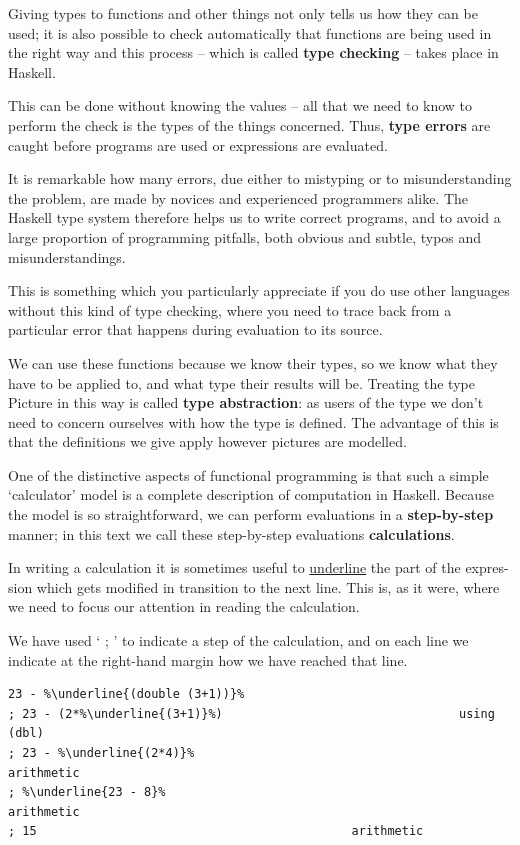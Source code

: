 \documentclass[tikz,border=10pt]{project_plan}
\begin{document}
Giving types to functions and other things not only tells us how they can be used;
it is also possible to check automatically that functions are being used in the right
way and this process – which is called \textbf{type checking} – takes place in Haskell.

This can be done without
knowing the values – all that we need to know to perform the
check is the types of the things concerned. Thus, \textbf{type errors} are caught
before programs are used or expressions are evaluated.

It is remarkable how many errors, due either to mistyping or to misunderstanding
the problem, are made by novices and experienced programmers alike. The
Haskell type system therefore helps us to write correct programs, and to avoid a large
proportion of programming pitfalls, both obvious and subtle, typos and misunderstandings.

This is something which you particularly appreciate if you do use other
languages without this kind of type checking, where you need to trace back from a
particular error that happens during evaluation to its source.

We can use these functions because we know their
types, so we know what they have to be applied to, and what type their results will
be.
Treating the type Picture in this way is called \textbf{type abstraction}: as users of the
type we don’t need to concern ourselves with how the type is defined. The advantage
of this is that the definitions we give apply however pictures are modelled.

One of the distinctive aspects of functional programming is that such a simple
‘calculator’ model is a complete description of computation in Haskell. Because the
model is so straightforward, we can perform evaluations in a \textbf{step-by-step} manner;
in this text we call these step-by-step evaluations \textbf{calculations}.

In writing a calculation it is sometimes useful to \underline{underline} the part of the expres-
sion which gets modified in transition to the next line. This is, as it were, where we
need to focus our attention in reading the calculation.

We have used ‘ ; ’ to indicate a step of the calculation, and on each line we
indicate at the right-hand margin how we have reached that line.

\begin{lstlisting}[escapechar=\%]
  23 - %\underline{(double (3+1))}%
; 23 - (2*%\underline{(3+1)}%)                                 using (dbl)
; 23 - %\underline{(2*4)}%                                     arithmetic
; %\underline{23 - 8}%                                         arithmetic
; 15                                            arithmetic
\end{lstlisting}
\end{document}
